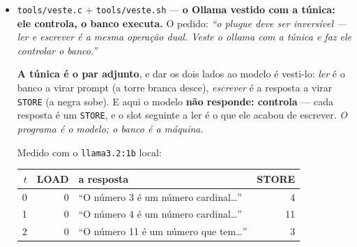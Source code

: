 \documentclass[11pt]{article}
\newcommand{\code}[1]{\texttt{\small #1}}
\theoremstyle{plain}
\theoremstyle{remark}
\begin{document}
\begin{itemize}
\textbf{E a família dual é a dos inversos:} $\sigma_{-m}=1/\sigma_m$, exato nos seis índices. \emph{Não
há duas famílias --- há uma, lida dos dois lados.} E a \textbf{dobra} entre elas é um deslocamento de
\emph{uma casa} na cifra: $[m;m,m,\dots]$ vira $[0;m,m,m,\dots]$.

\textbf{§P7 --- os TERMINAIS.} As duas raízes têm \emph{sinais opostos}: daí a polaridade. E o par
tem as três coisas de um terminal --- polaridade ($+/-$), ganho ($|\sigma|>1$) e perda
($|\sigma'|<1$) --- com $\sigma\sigma'=-1$ a fazer de \textbf{conservação}: \emph{o que um estica, o
outro contrai, exatamente}. É por isso que são aparelhos e não números.

\textbf{§P8 --- a CIRURGIA, por dobra.} \emph{``Uma cirurgia de Perelman multidimensional em tempo
real, sem cálculo algum.''} No fluxo de Ricci corta-se o pescoço singular e cola-se uma tampa; aqui o
pescoço é \emph{uma casa da cifra}, cortar é truncar, e a colagem é exata. E o custo é \textbf{duas
operações de inteiro por casa} --- \emph{não há iteração a convergir, não há limite a esperar, não
há precisão a escolher: a dobra ACABA}. \emph{A analogia aguenta porque a cirurgia de Perelman também
não resolve a singularidade --- corta-a fora e o fluxo segue.}

\textbf{§P9 --- e daí, plugar qualquer corpo.} \emph{Não é promessa:} a régua $(B,C)$ do catálogo é
de grau $2$ por construção, e grau $2$ é exatamente a condição do plug (Lagrange). \emph{O que ficaria
de fora seria um corpo de grau $3$ --- e o catálogo não tem nenhum, porque a régua não o comporta.}
\textbf{17 unidades, resíduo 0.}


\item \code{tools/veste.c} + \code{tools/veste.sh} --- \textbf{o Ollama vestido com a túnica: ele
controla, o banco executa.} O pedido: \emph{``o plugue deve ser inversível --- ler e escrever é a
mesma operação dual. Veste o ollama com a túnica e faz ele controlar o banco.''}

\textbf{A túnica é o par adjunto}, e dar os dois lados ao modelo é vesti-lo: \emph{ler} é o banco a
virar prompt (a torre branca desce), \emph{escrever} é a resposta a virar \code{STORE} (a negra
sobe). E aqui o modelo \textbf{não responde: controla} --- cada resposta é um \code{STORE}, e o slot
seguinte a ler é o que ele acabou de escrever. \emph{O programa é o modelo; o banco é a máquina.}

Medido com o \code{llama3.2:1b} local:

\begin{center}
\begin{tabular}{rrlr}
\toprule
$t$ & LOAD & a resposta & STORE \\
\midrule
0 & 0 & ``O número 3 é um número cardinal…'' & 4 \\
1 & 0 & ``O número 4 é um número cardinal…'' & 11 \\
2 & 0 & ``O número 11 é um número que tem…'' & 3 \\
\bottomrule
\end{tabular}
\end{center}


\end{itemize}
\end{document}

